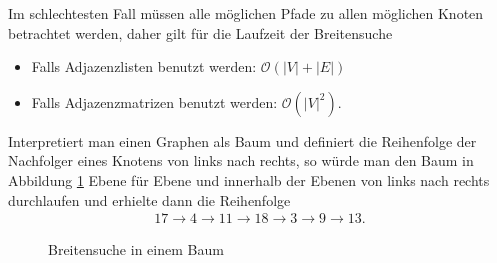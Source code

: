 \begin{proposition}[Laufzeit]
	Im schlechtesten Fall müssen alle möglichen Pfade zu allen möglichen Knoten betrachtet werden, daher gilt für die Laufzeit der Breitensuche
	\begin{itemize}
		\item Falls Adjazenzlisten benutzt werden: $\mathcal{O}(|V| + |E|)$
		\item Falls Adjazenzmatrizen benutzt werden: $\mathcal{O}(|V|^2)$.
	\end{itemize}
\end{proposition}

\begin{bsp}
	Interpretiert man einen Graphen als Baum und definiert die Reihenfolge der Nachfolger eines Knotens von links nach rechts, so würde man den Baum in Abbildung \ref{bfstree} Ebene für Ebene und innerhalb der Ebenen von links nach rechts durchlaufen und erhielte dann die Reihenfolge
	\begin{gather*}
		17 \rightarrow 4 \rightarrow 11 \rightarrow 18 \rightarrow 3 \rightarrow 9 \rightarrow 13 .
	\end{gather*}
\end{bsp}

\begin{figure}[!h]
	\centering
	\caption{Breitensuche in einem Baum}
	\label{bfstree}
\end{figure}
